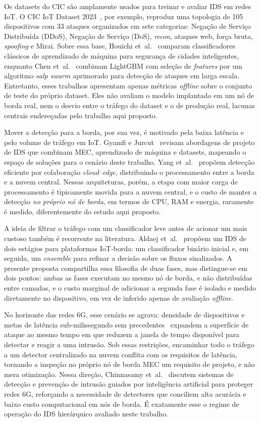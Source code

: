 \documentclass[12pt]{article}
\begin{document}
Os datasets do CIC são amplamente usados para treinar e avaliar IDS em redes IoT. O CIC IoT Dataset 2023~\cite{neto:23}, por exemplo, reproduz uma topologia de 105 dispositivos com 33 ataques organizados em sete categorias: Negação de Serviço Distribuída (DDoS), Negação de Serviço (DoS), \textit{recon}, ataques web, força bruta, \textit{spoofing} e Mirai. Sobre essa base, Houichi et~al.~\cite{houichi:25} comparam classificadores clássicos de aprendizado de
máquina para segurança de cidades inteligentes, enquanto Chen
et~al.~\cite{chen:24} combinam LightGBM com seleção de \textit{features} por um
algoritmo \textit{salp swarm} aprimorado para detecção de ataques em larga
escala. Entretanto, esses trabalhos apresentam apenas métricas \textit{offline} sobre o conjunto de teste do próprio dataset. Eles não avaliam o modelo implantado em
um nó de borda real, nem o desvio entre o tráfego do dataset e o de produção real, lacunas centrais endereçadas pelo trabalho aqui proposto.

Mover a detecção para a borda, por sua vez, é motivado pela baixa
latência e pelo volume de tráfego em IoT. Gyamfi e Jurcut~\cite{gyamfi:22}
revisam abordagens de projeto de IDS que combinam MEC, aprendizado de máquina e datasets, mapeando o espaço de soluções para o cenário deste
trabalho. Yang et~al.~\cite{yang:23} propõem detecção eficiente por colaboração \textit{cloud--edge}, distribuindo o processamento entre a borda e a nuvem central.
Nessas arquiteturas, porém, a etapa com maior carga de processamento é tipicamente movida para a nuvem central, e o custo de manter a detecção \textit{no próprio nó de borda}, em termos de CPU, RAM e energia, raramente é medido,  diferentemente do estudo aqui proposto. 

A ideia de filtrar o tráfego com um classificador leve antes de acionar um mais custoso também é recorrente na literatura. Aldaej et~al.~\cite{aldaej:24} propõem um IDS de dois estágios para plataformas
IoT-borda: um classificador binário inicial e, em seguida, um \textit{ensemble} para refinar a decisão sobre os fluxos sinalizados. A presente proposta compartilha essa filosofia de duas fases, mas distingue-se em dois pontos: ambas
as fases executam no mesmo nó de borda, e não distribuídas entre camadas, e o custo marginal de adicionar a segunda fase é isolado e medido diretamente no dispositivo, em vez de inferido apenas de avaliação
\textit{offline}.

No horizonte das redes 6G, esse cenário se agrava: densidade de
dispositivos e metas de latência sub-milissegundo sem precedentes~\cite{you:21}
expandem a superfície de ataque ao mesmo tempo em que reduzem a janela de
tempo disponível para detectar e reagir a uma intrusão. Sob essas restrições,
encaminhar todo o tráfego a um detector centralizado na nuvem conflita com os
requisitos de latência, tornando a inspeção no próprio nó de borda MEC um
requisito de projeto, e não mera otimização. Nessa direção, Chinnasamy
et~al.~\cite{chinnasamy:25} discutem sistemas de detecção e prevenção de intrusão
guiados por inteligência artificial para proteger redes 6G, reforçando a
necessidade de detectores que conciliem alta acurácia e baixo custo
computacional em nós de borda. É exatamente esse o regime de operação do IDS
hierárquico avaliado neste trabalho.
\end{document}
